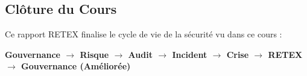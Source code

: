 \subsection{Clôture du Cours}

Ce rapport RETEX finalise le cycle de vie de la sécurité vu dans ce cours :
\begin{center}
\textbf{Gouvernance $\rightarrow$ Risque $\rightarrow$ Audit $\rightarrow$ Incident $\rightarrow$ Crise $\rightarrow$ RETEX $\rightarrow$ Gouvernance (Améliorée)}
\end{center}

